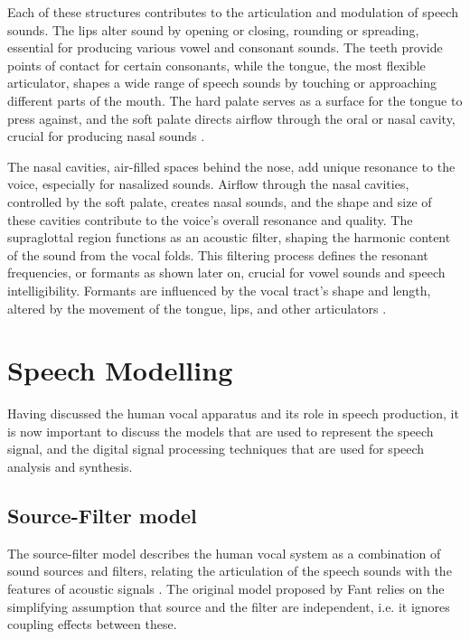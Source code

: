 Each of these structures contributes to the articulation and modulation of speech sounds. The lips alter sound by opening or closing, rounding or spreading, essential for producing various vowel and consonant sounds. The teeth provide points of contact for certain consonants, while the tongue, the most flexible articulator, shapes a wide range of speech sounds by touching or approaching different parts of the mouth. The hard palate serves as a surface for the tongue to press against, and the soft palate directs airflow through the oral or nasal cavity, crucial for producing nasal sounds \cite{mcloughlinSpeechAudioProcessing2016}.
 
The nasal cavities, air-filled spaces behind the nose, add unique resonance to the voice, especially for nasalized sounds. Airflow through the nasal cavities, controlled by the soft palate, creates nasal sounds, and the shape and size of these cavities contribute to the voice's overall resonance and quality. The supraglottal region functions as an acoustic filter, shaping the harmonic content of the sound from the vocal folds. This filtering process defines the resonant frequencies, or formants as shown later on, crucial for vowel sounds and speech intelligibility. Formants are influenced by the vocal tract's shape and length, altered by the movement of the tongue, lips, and other articulators \cite{sundbergFormantStructureArticulation2009}.


\section{Speech Modelling}

Having discussed the human vocal apparatus and its role in speech production, it is now important to discuss the models that are used to represent the speech signal, and the digital signal processing techniques that are used for speech analysis and synthesis.

\subsection{Source-Filter model}

The source-filter model describes the human vocal system as a combination of sound sources and filters, relating the articulation of the speech sounds with the features of acoustic signals \cite{ferreiraComunicacoesAudiovisuaisTecnologias2009}. The original model proposed by Fant \cite{Fant1960AcousticTO} relies on the simplifying assumption that source and the filter are independent, i.e. it ignores coupling effects between these.

